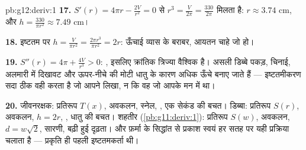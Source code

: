 \begin{solution}{pb:g12:deriv:1}
\textbf{17.} $S'(r) = 4\pi r - \frac{2V}{r^2} = 0$ से $r^3 = \frac{V}{2\pi} = \frac{330}{2\pi}$ मिलता है: $r \approx 3.74$ cm, और $h = \frac{330}{\pi r^2} \approx 7.49$ cm।

\textbf{18.} इष्टतम पर $h = \frac{V}{\pi r^2} = \frac{2\pi r^3}{\pi r^2}
= 2r$: ऊँचाई व्यास के बराबर, आयतन चाहे जो हो।

\textbf{19.} $S''(r) = 4\pi + \frac{4V}{r^3} > 0$: , इसलिए क्रांतिक त्रिज्या वैश्विक  है। असली
डिब्बे पकड़, चिनाई, अलमारी में दिखावट और ऊपर-नीचे की मोटी धातु के कारण अधिक
ऊँचे बनाए जाते हैं --- इष्टतमीकरण सदा ठीक वही  करता है जो आपने लिखा,
न कि वह जो आपके मन में था।

\textbf{20.} जीवनरक्षक: प्रतिरूप $T(x)$, अवकलन, स्नेल, , एक सेकंड की
बचत। डिब्बा: प्रतिरूप $S(r)$, अवकलन, $h = 2r$, , धातु की बचत। शहतीर
(\cref{pb:g11:deriv:1}): प्रतिरूप $S(w)$, अवकलन, $d = w\sqrt2$, सारणी, बढ़ी हुई दृढ़ता। और फ़र्मा के
सिद्धांत से प्रकाश स्वयं हर सतह पर यही प्रक्रिया चलाता है --- प्रकृति ही पहली
इष्टतमकर्ता थी।
\end{solution}
